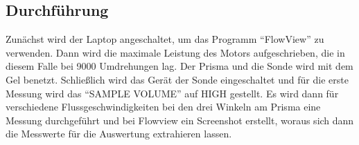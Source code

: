 \subsection{Durchführung}
Zunächst wird der Laptop angeschaltet, um das Programm \enquote{FlowView} zu verwenden.
Dann wird die maximale Leistung des Motors aufgeschrieben, die in diesem Falle bei 9000 Umdrehungen lag.
Der Prisma und die Sonde wird mit dem Gel benetzt.
Schließlich wird das Gerät der Sonde eingeschaltet und für die erste Messung wird das \enquote{SAMPLE VOLUME} auf HIGH gestellt.
Es wird dann für verschiedene Flussgeschwindigkeiten bei den drei Winkeln am Prisma eine Messung durchgeführt
und bei Flowview ein Screenshot erstellt, woraus sich dann die Messwerte für die Auswertung extrahieren lassen.
